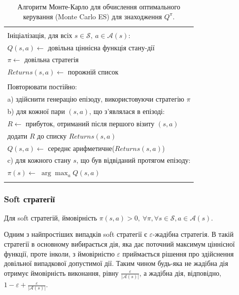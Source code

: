 \begin{table}
\begin{tabular}{|l|}
\hline\\
Ініціалізація, для всіх $s \in \mathcal{S},\ a \in \mathcal{A}(s)$:\\
\hspace{0.5cm} $Q(s,a) \leftarrow $ довільна ціннісна функція стану-дії\\
\hspace{0.5cm} $\pi \leftarrow $ довільна стратегія\\
\hspace{0.5cm} $Returns(s,a) \leftarrow $ порожній список\\
\\
Повторювати постійно:\\
\hspace{0.5cm} a) здійснити генерацію епізоду, використовуючи стратегію $\pi$\\
\hspace{0.5cm} b) для кожної пари $(s,a)$, що з'являлася в епізоді:\\
\hspace{1cm}      $R \leftarrow $ прибуток, отриманий після першого візиту $(s,a)$\\
\hspace{1cm}      додати $R$ до списку $Returns(s,a)$\\
\hspace{1cm}      $Q(s,a) \leftarrow $ середнє арифметичне($Returns(s,a)$)\\
\hspace{0.5cm} c) для кожного стану $s$, що був відвіданий протягом епізоду:\\
\hspace{1cm}      $\pi(s) \leftarrow $ $\arg\max_aQ(s,a)$\\
\\
\hline
\end{tabular}
\caption{Алгоритм Монте-Карло для обчислення оптимального керування (Monte Carlo ES) для знаходження $Q^\pi$.}
\end{table}

\subsubsection{Soft стратегії}

Для soft стратегій, ймовірність $\pi(s,a)>0,\ \forall \pi, \forall s \in \mathcal{S}, a \in \mathcal{A}(s)$.

Одним з найпростіших випадків soft стратегії є $\varepsilon$-жадібна стратегія. В такій стратегії в основному вибирається дія, яка дає поточний максимум ціннісної функції, проте інколи, з ймовірністю $\varepsilon$ приймається рішення про здійснення довільної випадкової допустимої дії. Таким чином будь-яка не жадібна дія отримує ймовірність виконання, рівну $\frac{\varepsilon}{|\mathcal{A}(s)|}$, а жадібна дія, відповідно, $ 1 - \varepsilon + \frac{\varepsilon}{|\mathcal{A}(s)|}$.

